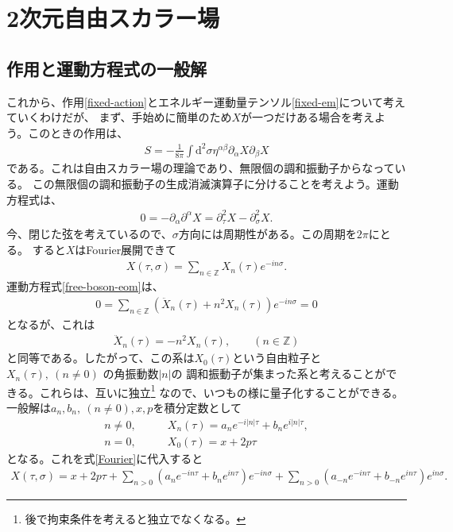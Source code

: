 \documentclass[report,paper=a4, fontsize=12pt, line_length=16cm, number_of_lines=33,dvipdfmx]{jlreq}
\numberwithin{equation}{chapter}
\numberwithin{equation}{section}
\newcommand{\Zb}{\mathbb{Z}}
\newcommand{\del}{\partial}
\newcommand{\di}{\mathrm{d}}
\begin{document}
\section{2次元自由スカラー場}
\subsection{作用と運動方程式の一般解}
これから、作用\eqref{fixed-action}とエネルギー運動量テンソル\eqref{fixed-em}について考えていくわけだが、
まず、手始めに簡単のため$X$が一つだけある場合を考えよう。このときの作用は、
\begin{align}
S=-\frac{1}{8\pi}\int \di^2\sigma \eta^{\alpha\beta}\del_{\alpha} X \del_{\beta} X
\label{free-boson-action}
\end{align}
である。これは自由スカラー場の理論であり、無限個の調和振動子からなっている。
この無限個の調和振動子の生成消滅演算子に分けることを考えよう。運動方程式は、
\begin{align}
0=-\del_{\alpha}\del^{\alpha}X=\del_{\tau}^2 X-\del_{\sigma}^2 X.
\label{free-boson-eom}
\end{align}
今、閉じた弦を考えているので、$\sigma$方向には周期性がある。この周期を$2\pi$にとる。
すると$X$はFourier展開できて
\begin{align}
  X(\tau,\sigma)=\sum_{n\in \Zb} X_n(\tau)e^{-in\sigma}. \label{Fourier}
\end{align}
運動方程式\eqref{free-boson-eom}は、
\begin{align}
  0=\sum_{n\in \Zb} (\ddot{X}_{n}(\tau)+n^2 X_{n}(\tau))e^{-in\sigma}=0
\end{align}
となるが、これは
\begin{align}
\ddot{X}_n(\tau)=-n^2 X_n(\tau),\qquad (n\in \Zb)
\end{align}
と同等である。したがって、この系は$X_0(\tau)$という自由粒子と$X_{n}(\tau),\ (n\ne 0)$ の角振動数$|n|$の
調和振動子が集まった系と考えることができる。これらは、互いに独立\footnote{後で拘束条件を考えると独立でなくなる。}
なので、いつもの様に量子化することができる。一般解は$a_n, b_n, \ (n\ne0),x, p$を積分定数として
\begin{align}
n\ne 0,\qquad & X_{n}(\tau)=a_n e^{-i|n|\tau}+b_n e^{i|n|\tau},\\
n = 0,\qquad & X_{0}(\tau)=x+2p\tau
\end{align}
となる。これを式\eqref{Fourier}に代入すると
\begin{align}
X(\tau,\sigma)=
x+2p\tau
+\sum_{n>0} (a_ne^{-in\tau}+b_n e^{in\tau})e^{-in\sigma}
+\sum_{n>0} (a_{-n}e^{-in\tau}+b_{-n}e^{in\tau})e^{in\sigma}.
\end{align}
\end{document}
